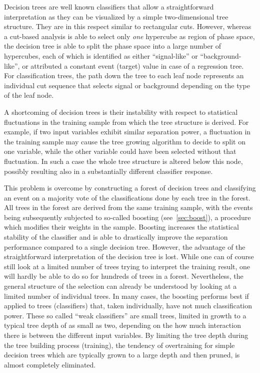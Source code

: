 Decision trees are well known classifiers that allow a straightforward
interpretation as they can be visualized by a simple two-dimensional
tree structure. They are in this respect similar to rectangular cuts.
However, whereas a cut-based analysis is able to select only {\em one}
hypercube as region of phase space, the decision tree is able to split
the phase space into a large number of hypercubes, each of which is
identified as either ``signal-like'' or ``background-like'', or
attributed a constant event (target) value in case of a regression
tree. For classification trees, the path down the tree to each leaf
node represents an individual cut sequence that selects signal or
background depending on the type of the leaf node.
 
A shortcoming of decision trees is their instability with respect to 
statistical fluctuations in the training sample from which the tree
structure is derived. For example, if two input variables exhibit
similar separation power, a fluctuation in the training sample may cause the 
tree growing algorithm to decide to split on one variable, while the other 
variable could have been selected without that fluctuation. In
such a case the whole tree structure is altered below this node,
possibly resulting also in a substantially different classifier response.

This problem is overcome by constructing a forest of
decision trees and classifying an event on a majority vote of the
classifications done by each tree in the forest. All trees in the
forest are derived from the same training sample, with the events
being subsequently subjected to so-called boosting
(see~\ref{sec:boost}), a procedure which modifies their weights in the
sample. Boosting increases the statistical stability of the classifier
and is able to drastically improve the separation performance compared
to a single decision tree.  However, the advantage of the
straightforward interpretation of the decision tree is lost. While one
can of course still look at a limited number of trees trying to
interpret the training result, one will hardly be able to do so for
hundreds of trees in a forest. Nevertheless, the general structure of
the selection can already be understood by looking at a limited number
of individual trees.  In many cases, the boosting performs best if
applied to trees (classifiers) that, taken individually, have not much
classification power. These so called ``weak classifiers'' are small
trees, limited in growth to a typical tree depth of as small as two,
depending on the how much interaction there is between the different
input variables. By limiting the tree depth during the tree building 
process (training), the tendency of overtraining for simple decision
trees which are typically grown to a large depth and then pruned, is
almost completely eliminated.

